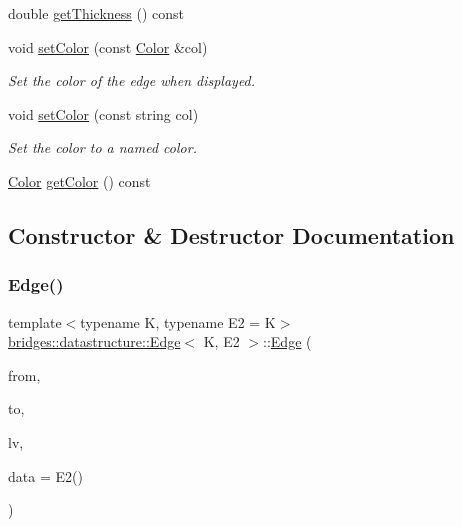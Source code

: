 \begin{DoxyCompactItemize}
double \hyperlink{classbridges_1_1datastructure_1_1_edge_a6163e53061d4785b969fa664dbae104b}{get\+Thickness} () const
\item 
void \hyperlink{classbridges_1_1datastructure_1_1_edge_a9eab71fed936587b2a3109d3df3c46fb}{set\+Color} (const \hyperlink{classbridges_1_1datastructure_1_1_color}{Color} \&col)
\begin{DoxyCompactList}\small\item\em Set the color of the edge when displayed. \end{DoxyCompactList}\item 
void \hyperlink{classbridges_1_1datastructure_1_1_edge_a5a38f46e9662624af4de9fcf596c4783}{set\+Color} (const string col)
\begin{DoxyCompactList}\small\item\em Set the color to a named color. \end{DoxyCompactList}\item 
\hyperlink{classbridges_1_1datastructure_1_1_color}{Color} \hyperlink{classbridges_1_1datastructure_1_1_edge_abb5c66b734e1ac71e5d4e012908ec7a4}{get\+Color} () const
\end{DoxyCompactItemize}


\subsection{Constructor \& Destructor Documentation}
\mbox{\label{classbridges_1_1datastructure_1_1_edge_aae44cef647b20d260b449a5fb041ae95}} 
\subsubsection{\texorpdfstring{Edge()}{Edge()}}
{\footnotesize\ttfamily template$<$typename K, typename E2 = K$>$ \\
\hyperlink{classbridges_1_1datastructure_1_1_edge}{bridges\+::datastructure\+::\+Edge}$<$ K, E2 $>$\+::\hyperlink{classbridges_1_1datastructure_1_1_edge}{Edge} (\begin{DoxyParamCaption}\item[{const K \&}]{from,  }\item[{const K \&}]{to,  }\item[{\hyperlink{classbridges_1_1datastructure_1_1_link_visualizer}{Link\+Visualizer} $\ast$}]{lv,  }\item[{const E2 \&}]{data = {\ttfamily E2()} }\end{DoxyParamCaption})\hspace{0.3cm}{\ttfamily [inline]}}



